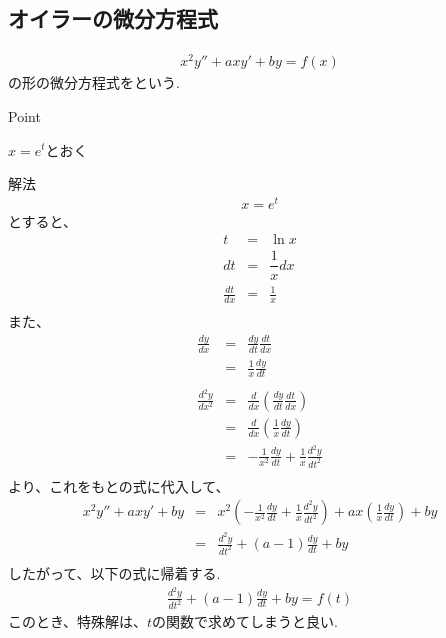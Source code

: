 \documentclass[a4paper]{jsarticle}
\begin{document}
\subsection{オイラーの微分方程式}
\begin{eqnarray*}
    x^2y''+axy'+by=f\left(x\right)
\end{eqnarray*}
の形の微分方程式をという.
\begin{itembox}[l]{Point}
    \begin{center}
        $x=e^t$とおく
    \end{center}
\end{itembox}
\begin{itembox}[l]{解法}
    \begin{eqnarray*}
        x=e^t
    \end{eqnarray*}
    とすると、
    \begin{eqnarray*}
        t&=&\ln x\\
        dt&=&\dfrac{1}{x}dx\\
        \frac{dt}{dx}&=&\frac{1}{x}\\
    \end{eqnarray*}
    また、
    \begin{eqnarray*}
        \frac{dy}{dx}&=&\frac{dy}{dt}\frac{dt}{dx}\\
        &=&\frac{1}{x}\frac{dy}{dt}\\
        \\
        \frac{d^2y}{dx^2}&=&\frac{d}{dx}\left(\frac{dy}{dt}\frac{dt}{dx}\right)\\
        &=&\frac{d}{dx}\left(\frac{1}{x}\frac{dy}{dt}\right)\\
        &=&-\frac{1}{x^2}\frac{dy}{dt}+\frac{1}{x}\frac{d^2y}{dt^2}\\
    \end{eqnarray*}
    より、これをもとの式に代入して、
    \begin{eqnarray*}
        x^2y''+axy'+by
        &=&x^2\left(-\frac{1}{x^2}\frac{dy}{dt}+\frac{1}{x}\frac{d^2y}{dt^2}\right)+ax\left(\frac{1}{x}\frac{dy}{dt}\right)+by\\
        &=&\frac{d^2y}{dt^2}+\left(a-1\right)\frac{dy}{dt}+by\\
    \end{eqnarray*}
    したがって、以下の式に帰着する.
    \begin{eqnarray*}
        \frac{d^2y}{dt^2}+\left(a-1\right)\frac{dy}{dt}+by=f\left(t\right)
    \end{eqnarray*}
    このとき、特殊解は、$t$の関数で求めてしまうと良い.
\end{itembox}
\newpage
\end{document}
